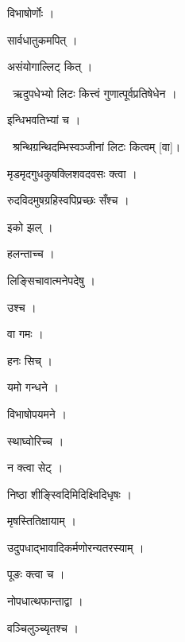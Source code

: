\documentclass[10pt, openany, oneside]{book}
\begin{document}
\noindent विभाषोर्णोः ।

\noindent सार्वधातुकमपित् ।

\noindent असंयोगाल्लिट् कित् ।

\par\noindent\hspace{1.5em}{\vps वा॰}~{\qt ऋदुपधेभ्यो लिटः कित्त्वं गुणात्पूर्वप्रतिषेधेन ।}

\noindent इन्धिभवतिभ्यां च ।

\par\noindent\hspace{1.5em}{\vps वा॰}~{\qt श्रन्थिग्रन्थिदम्भिस्वञ्जीनां लिटः कित्वम् [वा]।}

\noindent मृडमृदगुधकुषक्लिशवदवसः क्त्वा ।

\noindent रुदविदमुषग्रहिस्वपिप्रच्छः सँश्च ।

\noindent इको झल् ।

\noindent हलन्ताच्च ।

\noindent लिङ्सिचावात्मनेपदेषु ।

\noindent उश्च ।

\noindent वा गमः ।

\noindent हनः सिच् ।

\noindent यमो गन्धने ।

\noindent विभाषोपयमने ।

\noindent स्थाघ्वोरिच्च ।

\noindent न क्त्वा सेट् ।

\noindent निष्ठा शीङ्स्विदिमिदिक्ष्विदिधृषः ।

\noindent मृषस्तितिक्षायाम् ।

\noindent उदुपधाद्भावादिकर्मणोरन्यतरस्याम् ।

\noindent पूङः क्त्वा च ।

\noindent नोपधात्थफान्ताद्वा ।

\noindent वञ्चिलुञ्च्यृतश्च ।
\end{document}
